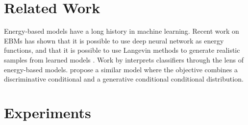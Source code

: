 \documentclass[tablecaption=bottom,wcp]{jmlr} %
\begin{document}


\vspace*{-0.5ex}
\section{Related Work}
\label{sec:related-work}
\vspace*{-1.5ex}
Energy-based models \cite{lecun2006tutorial} have a long history in machine learning. Recent work on EBMs has shown that it is possible to use deep neural network as energy functions, and that it is possible to use Langevin methods to generate realistic samples from learned models \cite{nijkamp2019anatomy, nijkamp2019learning, du2019implicit,xie2016theory}. Work by \citet{grathwohl2019your} interprets classifiers through the lens of energy-based models. \citet{liu2020hybrid} propose a similar model where the objective combines a discriminative conditional and a generative conditional conditional distribution.

\vspace*{-0.5ex}
\section{Experiments}
\label{sec:experiments}
\end{document}
